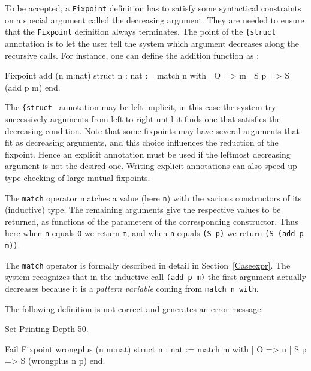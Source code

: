 To be accepted, a {\tt Fixpoint} definition has to satisfy some
syntactical constraints on a special argument called the decreasing
argument. They are needed to ensure that the {\tt Fixpoint} definition
always terminates. The point of the {\tt \{struct \ident {\tt \}}}
annotation is to let the user tell the system which argument decreases
along the recursive calls. For instance, one can define the addition 
function as :

\begin{coq_example}
Fixpoint add (n m:nat) {struct n} : nat :=
  match n with
  | O => m
  | S p => S (add p m)
  end.
\end{coq_example}

The {\tt \{struct \ident {\tt \}}} annotation may be left implicit, in
this case the system try successively arguments from left to right
until it finds one that satisfies the decreasing condition. Note that
some fixpoints may have several arguments that fit as decreasing
arguments, and this choice influences the reduction of the
fixpoint. Hence an explicit annotation must be used if the leftmost
decreasing argument is not the desired one. Writing explicit
annotations can also speed up type-checking of large mutual fixpoints.

The {\tt match} operator matches a value (here \verb:n:) with the
various constructors of its (inductive) type. The remaining arguments
give the respective values to be returned, as functions of the
parameters of the corresponding constructor. Thus here when \verb:n:
equals \verb:O: we return \verb:m:, and when \verb:n: equals 
\verb:(S p): we return \verb:(S (add p m)):.

The {\tt match} operator is formally described
in detail in Section~\ref{Caseexpr}.  The system recognizes that in
the inductive call {\tt (add p m)} the first argument actually
decreases because it is a {\em pattern variable} coming from {\tt match
  n with}.

\Example The following definition is not correct and generates an
error message:

\begin{coq_eval}
Set Printing Depth 50.
\end{coq_eval}
\begin{coq_example}
Fail Fixpoint wrongplus (n m:nat) {struct n} : nat :=
  match m with
  | O => n
  | S p => S (wrongplus n p)
  end.
\end{coq_example}

